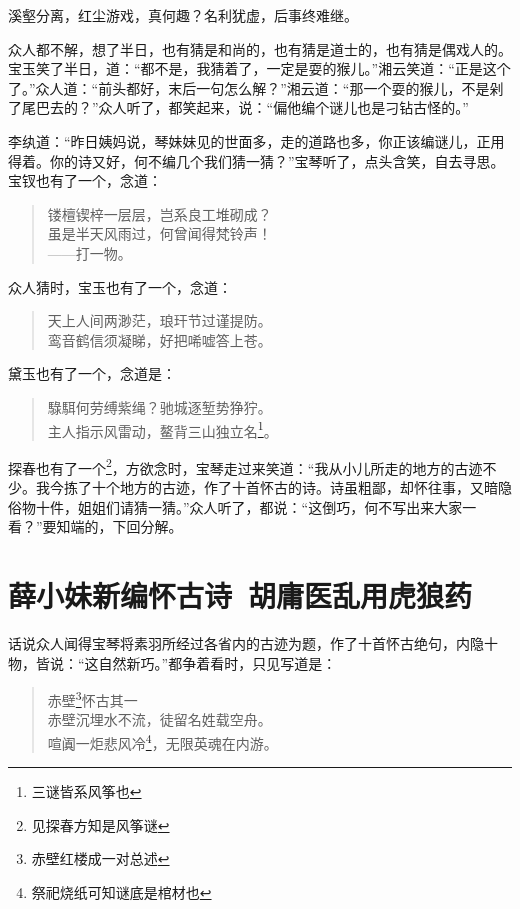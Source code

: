 \documentclass[12pt,oneside]{book}
\newenvironment{shici}{%
\begin{verse}%
\centering\large\hspace{12pt}}%
{\end{verse}}
\begin{document}
溪壑分离，红尘游戏，真何趣？名利犹虚，后事终难继。

众人都不解，想了半日，也有猜是和尚的，也有猜是道士的，也有猜是偶戏人的。宝玉笑了半日，道：“都不是，我猜着了，一定是耍的猴儿。”湘云笑道：“正是这个了。”众人道：“前头都好，末后一句怎么解？”湘云道：“那一个耍的猴儿，不是剁了尾巴去的？”众人听了，都笑起来，说：“偏他编个谜儿也是刁钻古怪的。”

李纨道：“昨日姨妈说，琴妹妹见的世面多，走的道路也多，你正该编谜儿，正用得着。你的诗又好，何不编几个我们猜一猜？”宝琴听了，点头含笑，自去寻思。宝钗也有了一个，念道：

\begin{shici}
镂檀锲梓一层层，岂系良工堆砌成？\\
虽是半天风雨过，何曾闻得梵铃声！\\
——打一物。
\end{shici}

众人猜时，宝玉也有了一个，念道：

\begin{shici}
天上人间两渺茫，琅玕节过谨提防。\\
鸾音鹤信须凝睇，好把唏嘘答上苍。
\end{shici}


黛玉也有了一个，念道是：

\begin{shici}
騄駬何劳缚紫绳？驰城逐堑势狰狞。\\
主人指示风雷动，鳌背三山独立名\footnote{三谜皆系风筝也}。
\end{shici}


探春也有了一个\footnote{见探春方知是风筝谜}，方欲念时，宝琴走过来笑道：“我从小儿所走的地方的古迹不少。我今拣了十个地方的古迹，作了十首怀古的诗。诗虽粗鄙，却怀往事，又暗隐俗物十件，姐姐们请猜一猜。”众人听了，都说：“这倒巧，何不写出来大家一看？”要知端的，下回分解。

 
 
\chapter{薛小妹新编怀古诗~胡庸医乱用虎狼药}
话说众人闻得宝琴将素羽所经过各省内的古迹为题，作了十首怀古绝句，内隐十物，皆说：“这自然新巧。”都争着看时，只见写道是：

\begin{shici}
赤壁\footnote{赤壁红楼成一对总述}怀古其一\\
赤壁沉埋水不流，徒留名姓载空舟。\\
喧阗一炬悲风冷\footnote{祭祀烧纸可知谜底是棺材也}，无限英魂在内游。
\end{shici}
\end{document}
